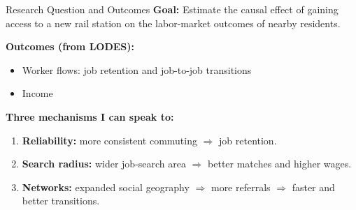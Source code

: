 \documentclass{beamer}
\begin{document}
\begin{frame}{Research Question and Outcomes}
\textbf{Goal:} Estimate the causal effect of gaining access to a new rail station on the
labor-market outcomes of nearby residents.

\bigskip
\textbf{Outcomes (from LODES):}
\begin{itemize}
    \item Worker flows: job retention and job-to-job transitions
    \item Income
\end{itemize}

\bigskip
\textbf{Three mechanisms I can speak to:}
\begin{enumerate}
    \item \textbf{Reliability:} more consistent commuting $\Rightarrow$ job retention.
    \item \textbf{Search radius:} wider job-search area $\Rightarrow$ better matches and higher wages.
    \item \textbf{Networks:} expanded social geography $\Rightarrow$ more referrals $\Rightarrow$
          faster and better transitions.
\end{enumerate}
\end{frame}
\end{document}
